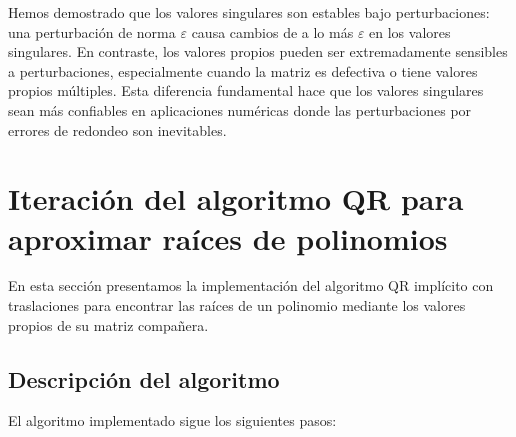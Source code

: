\documentclass[12pt]{article}
\begin{document}
Hemos demostrado que los valores singulares son estables bajo perturbaciones: una perturbación de norma $\varepsilon$ causa cambios de a lo más $\varepsilon$ en los valores singulares. En contraste, los valores propios pueden ser extremadamente sensibles a perturbaciones, especialmente cuando la matriz es defectiva o tiene valores propios múltiples. Esta diferencia fundamental hace que los valores singulares sean más confiables en aplicaciones numéricas donde las perturbaciones por errores de redondeo son inevitables.

\vspace{2cm}

\section{Iteración del algoritmo QR para aproximar raíces de polinomios}

En esta sección presentamos la implementación del algoritmo QR implícito con traslaciones para encontrar las raíces de un polinomio mediante los valores propios de su matriz compañera.

\subsection{Descripción del algoritmo}

El algoritmo implementado sigue los siguientes pasos:
\end{document}
